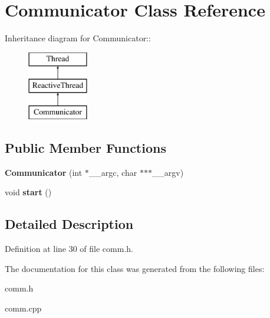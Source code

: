 \section{Communicator Class Reference}
\label{class_communicator}
Inheritance diagram for Communicator::\begin{figure}[H]
\begin{center}
\leavevmode
\includegraphics[height=3cm]{class_communicator}
\end{center}
\end{figure}
\subsection*{Public Member Functions}
\begin{CompactItemize}
\item 
{\bf Communicator} (int $\ast$\_\-\_\-argc, char $\ast$$\ast$$\ast$\_\-\_\-argv)\label{class_communicator_7c9dce4ea92bd04d01d53f80c0ef08ee}

\item 
void {\bf start} ()\label{class_communicator_142fae13b16b166519315f248a513c62}

\end{CompactItemize}


\subsection{Detailed Description}




Definition at line 30 of file comm.h.

The documentation for this class was generated from the following files:\begin{CompactItemize}
\item 
comm.h\item 
comm.cpp\end{CompactItemize}
